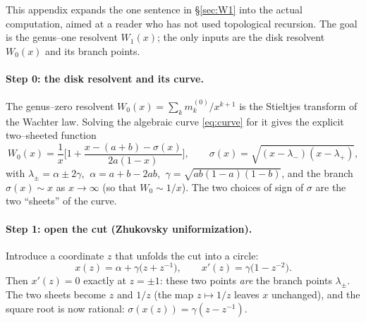 \documentclass[11pt]{article}
\newif\ifpedagogical
\newcommand{\ped}[1]{\ifpedagogical\par\smallskip{\small\color{pedcol}%
  \leftskip=1.4em\rightskip=1.4em\noindent$\triangleright$~\textit{Plain-language aside.}~#1\par}%
  \par\smallskip\fi}
\begin{document}
This appendix expands the one sentence in \S\ref{sec:W1} into the actual computation, aimed at a
reader who has not used topological recursion. The goal is the genus--one resolvent $W_1(x)$; the
only inputs are the disk resolvent $W_0(x)$ and its branch points.

\ped{Everything below is a way to compute the numbers $m_k^{(1)}$ (the ``handle'' corrections to the
moments) all at once. Instead of computing them one $k$ at a time from Weingarten, we find the single
function $W_1(x)$ whose Taylor coefficients at large $x$ \emph{are} the $m_k^{(1)}$. Topological
recursion is the tool that produces $W_1$ from the disk data by residues.}

\paragraph{Step 0: the disk resolvent and its curve.}
The genus--zero resolvent $W_0(x)=\sum_k m_k^{(0)}/x^{k+1}$ is the Stieltjes transform of the Wachter
law. Solving the algebraic curve \eqref{eq:curve} for it gives the explicit two--sheeted function
\begin{equation}
  W_0(x)=\frac1x\Big[1+\frac{x-(a+b)-\sigma(x)}{2a(1-x)}\Big],\qquad
  \sigma(x)=\sqrt{(x-\lambda_-)(x-\lambda_+)},
  \label{eq:W0app}
\end{equation}
with $\lambda_\pm=\alpha\pm2\gamma$, $\ \alpha=a+b-2ab$, $\ \gamma=\sqrt{ab(1-a)(1-b)}$, and the branch
$\sigma(x)\sim x$ as $x\to\infty$ (so that $W_0\sim1/x$). The two choices of sign of $\sigma$ are the
two ``sheets'' of the curve.
\ped{A resolvent has a square--root branch cut running along the interval $[\lambda_-,\lambda_+]$
where the eigenvalues sit. ``Two sheets'' just means $\sqrt{\ \cdot\ }$ has two signs; the physical
one is picked by $W_0\to1/x$ at infinity (total probability $=1$). The endpoints $\lambda_\pm$ are
the \emph{branch points}, and they are where all the action of the recursion happens.}

\paragraph{Step 1: open the cut (Zhukovsky uniformization).}
Introduce a coordinate $z$ that unfolds the cut into a circle:
\begin{equation}
  x(z)=\alpha+\gamma\big(z+z^{-1}\big),\qquad x'(z)=\gamma\big(1-z^{-2}\big).
\end{equation}
Then $x'(z)=0$ exactly at $z=\pm1$: these two points \emph{are} the branch points $\lambda_\pm$. The
two sheets become $z$ and $1/z$ (the map $z\mapsto1/z$ leaves $x$ unchanged), and the square root is
now rational: $\sigma(x(z))=\gamma(z-z^{-1})$.
\ped{Why do this? Residue calculus is easy on the sphere (the $z$--plane) and awful on a branched
$x$--plane. The Zhukovsky map trades the ugly $\sqrt{\ \cdot\ }$ for a rational function of $z$, so
every step below is elementary residues at $z=\pm1$.}
\end{document}
